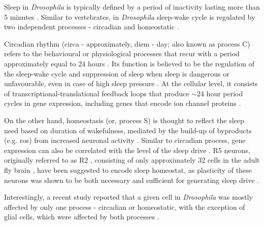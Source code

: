 \documentclass[../main.tex]{subfiles}
\begin{document}
Sleep in \textit{Drosophila} is typically defined by a period of inactivity lasting more than 5 minutes \parencite{dubowyCircadianRhythmsSleep2017,shaferRegulationDrosophilaSleep2021}. Similar to vertebrates, in \textit{Drosophila} sleep-wake cycle is regulated by two independent processes - circadian and homeostatic \parencite{doppSinglecellTranscriptomicsReveals2024,liuSleepDriveEncoded2016}.

Circadian rhythm (circa - approximately, diem - day; also known as process C) refers to the behavioural or physiological processes that recur with a period approximately equal to 24 hours \parencite{fernandez-chiappeHighFrequencyNeuronalBursting2021,dubowyCircadianRhythmsSleep2017}. Its function is believed to be the regulation of the sleep-wake cycle and suppression of sleep when sleep is dangerous or unfavourable, even in case of high sleep pressure \parencite{shaferRegulationDrosophilaSleep2021,andreaniCircadianProgrammingEllipsoid2022}.
At the cellular level, it consists of transcriptional-translational feedback loops that produce $\sim 24$ hour period cycles in gene expression, including genes that encode ion channel proteins
\parencite{doppSinglecellTranscriptomicsReveals2024,dubowyCircadianRhythmsSleep2017,andreaniCircadianProgrammingEllipsoid2022}.

On the other hand, homeostasis (or, process S) is thought to reflect the sleep need based on duration of wakefulness, mediated by the build-up of byproducts (e.g. \gls{ros}) from increased neuronal activity
\parencite{suarez-grimaltNeuralArchitectureSleep2021,doppSinglecellTranscriptomicsReveals2024,andreaniCircadianProgrammingEllipsoid2022,schmutzSpecificRoleREVERBaControlled2014}. Similar to circadian process, gene expression can also be correlated with the level of the sleep drive \parencite{liuSleepDriveEncoded2016}.
R5 neurons, originally referred to as R2 \parencite{shaferRegulationDrosophilaSleep2021,liuSleepDriveEncoded2016,donleaRecurrentCircuitryBalancing2018},
consisting of only approximately 32 cells in the adult fly brain \parencite{doppSinglecellTranscriptomicsReveals2024}, have been suggested to encode sleep homeostat, as plasticity of these neurons was shown to be both necessary and sufficient for generating sleep drive \parencite{liuSleepDriveEncoded2016,doppSinglecellTranscriptomicsReveals2024}.

Interestingly, a recent study reported that a given cell in \textit{Drosophila} was mostly affected by only one process - circadian or homeostatic, with the exception of glial cells, which were affected by both processes \parencite{doppSinglecellTranscriptomicsReveals2024}.
\end{document}
